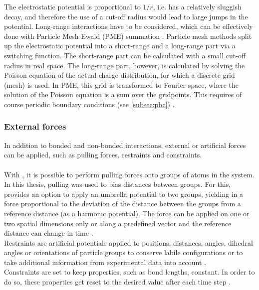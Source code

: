 The electrostatic potential is proportional to $1/r$, i.e. has a relatively sluggish decay, and therefore the use of a cut-off radius would lead to large jumps in the potential. Long-range interactions have to be considered, which can be effectively done with Particle Mesh Ewald (PME) summation \autocite{pme}. Particle mesh methods split up the electrostatic potential into a short-range and a long-range part via a switching function. The short-range part can be calculated with a small cut-off radius in real space. The long-range part, however, is calculated by solving the Poisson equation of the actual charge distribution, for which a discrete grid (mesh) is used. In PME, this grid is transformed to Fourier space, where the solution of the Poisson equation is a sum over the gridpoints. This requires of course periodic boundary conditions (see \autoref*{subsec:pbc}) \autocite[p. 246-251]{greenBook}.
\subsubsection{External forces}
In addition to bonded and non-bonded interactions, external or artificial forces can be applied, such as pulling forces, restraints and constraints.\\
\\
With \gromacs{}, it is possible to perform pulling forces onto groups of atoms in the system. In this thesis, pulling was used to bias distances between groups. For this, \gromacs{} provides an option to apply an umbrella potential to two groups, yielding in a force proportional to the deviation of the distance between the groups from a reference distance (as a harmonic potential). The force can be applied on one or two spatial dimensions only or along a predefined vector and the reference distance can change in time  \autocite[p. 154-159]{gromacsManual}.\\
Restraints are artificial potentials applied to positions, distances, angles, dihedral angles or orientations of particle groups
to conserve labile configurations or to take additional information from experimental data into account \autocite[p. 84f]{gromacsManual}.\\
Constraints are set to keep properties, such as bond lengths, constant. In order to do so, these properties get reset to the desired value after each time step \autocite[p. 44f]{gromacsManual}. %

